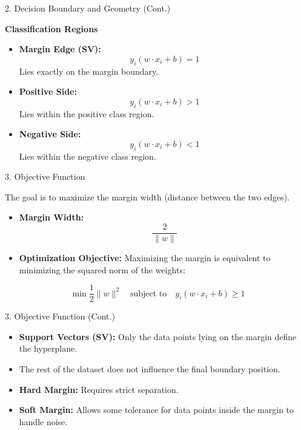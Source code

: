 \documentclass{beamer}
\begin{document}
\begin{frame}{2. Decision Boundary and Geometry (Cont.)}

\textbf{Classification Regions}

\begin{itemize}
    \item \textbf{Margin Edge (SV):}
    \[
    y_i(w \cdot x_i + b) = 1
    \]
    Lies exactly on the margin boundary.
    
    \item \textbf{Positive Side:}
    \[
    y_i(w \cdot x_i + b) > 1
    \]
    Lies within the positive class region.
    
    \item \textbf{Negative Side:}
    \[
    y_i(w \cdot x_i + b) < 1
    \]
    Lies within the negative class region.
\end{itemize}

\end{frame}

\begin{frame}{3. Objective Function}

The goal is to maximize the margin width (distance between the two edges).

\begin{itemize}
    \item \textbf{Margin Width:}
    \[
    \frac{2}{\|w\|}
    \]
    
    \item \textbf{Optimization Objective:}
    Maximizing the margin is equivalent to minimizing the squared norm of the weights:
\end{itemize}

\[
\min \frac{1}{2} \|w\|^2 
\quad 
\text{subject to} 
\quad 
y_i(w \cdot x_i + b) \ge 1
\]

\end{frame}

\begin{frame}{3. Objective Function (Cont.)}

\begin{itemize}
    \item \textbf{Support Vectors (SV):}
    Only the data points lying on the margin define the hyperplane.
    
    \item The rest of the dataset does not influence the final boundary position.
    
    \item \textbf{Hard Margin:}
    Requires strict separation.
    
    \item \textbf{Soft Margin:}
    Allows some tolerance for data points inside the margin to handle noise.
\end{itemize}

\end{frame}
\end{document}
